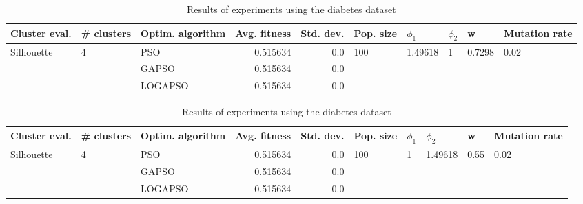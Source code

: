 \documentclass{article}
\begin{document}
\begin{table}
\centering
\caption{Results of experiments using the diabetes dataset}
\begin{tabular}{lllrrlllll}
\toprule
              Cluster eval. &        \# clusters & Optim. algorithm &  Avg. fitness &  Std. dev. &            Pop. size &               $\phi_{1}$ &         $\phi_{2}$ &                       w &         Mutation rate \\
\midrule
\multirow{3}{*}{Silhouette} & \multirow{3}{*}{4} &              PSO &      0.515634 &        0.0 & \multirow{3}{*}{100} & \multirow{3}{*}{1.49618} & \multirow{3}{*}{1} & \multirow{3}{*}{0.7298} & \multirow{3}{*}{0.02} \\
                            &                    &            GAPSO &      0.515634 &        0.0 &                      &                          &                    &                         &                       \\
                            &                    &          LOGAPSO &      0.515634 &        0.0 &                      &                          &                    &                         &                       \\
\bottomrule
\end{tabular}
\end{table}
\begin{table}
\centering
\caption{Results of experiments using the diabetes dataset}
\begin{tabular}{lllrrlllll}
\toprule
              Cluster eval. &        \# clusters & Optim. algorithm &  Avg. fitness &  Std. dev. &            Pop. size &         $\phi_{1}$ &               $\phi_{2}$ &                     w &         Mutation rate \\
\midrule
\multirow{3}{*}{Silhouette} & \multirow{3}{*}{4} &              PSO &      0.515634 &        0.0 & \multirow{3}{*}{100} & \multirow{3}{*}{1} & \multirow{3}{*}{1.49618} & \multirow{3}{*}{0.55} & \multirow{3}{*}{0.02} \\
                            &                    &            GAPSO &      0.515634 &        0.0 &                      &                    &                          &                       &                       \\
                            &                    &          LOGAPSO &      0.515634 &        0.0 &                      &                    &                          &                       &                       \\
\bottomrule
\end{tabular}
\end{table}
\end{document}

